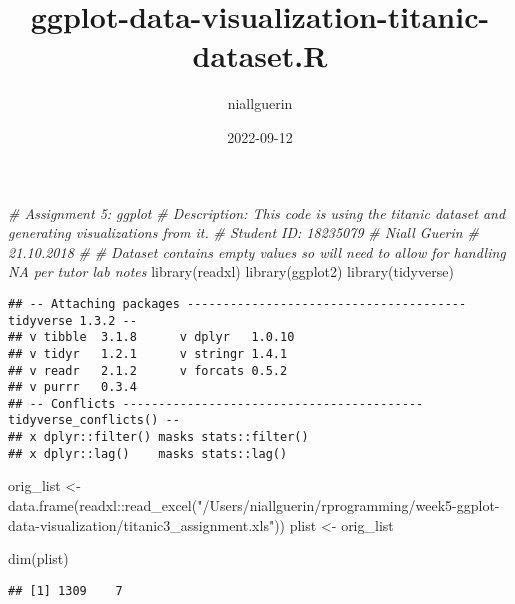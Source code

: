 \documentclass[
]{article}
\title{ggplot-data-visualization-titanic-dataset.R}
\author{niallguerin}
\date{2022-09-12}
\newenvironment{Shaded}{\begin{snugshade}}{\end{snugshade}}
\newcommand{\CommentTok}[1]{\textcolor[rgb]{0.56,0.35,0.01}{\textit{#1}}}
\newcommand{\FunctionTok}[1]{\textcolor[rgb]{0.00,0.00,0.00}{#1}}
\newcommand{\NormalTok}[1]{#1}
\newcommand{\OtherTok}[1]{\textcolor[rgb]{0.56,0.35,0.01}{#1}}
\newcommand{\SpecialCharTok}[1]{\textcolor[rgb]{0.00,0.00,0.00}{#1}}
\newcommand{\StringTok}[1]{\textcolor[rgb]{0.31,0.60,0.02}{#1}}
\begin{document}
\maketitle

\begin{Shaded}
\begin{Highlighting}[]
\CommentTok{\# Assignment 5: ggplot}
\CommentTok{\# Description: This code is using the titanic dataset and generating visualizations from it.}
\CommentTok{\# Student ID: 18235079}
\CommentTok{\# Niall Guerin}
\CommentTok{\# 21.10.2018}
\CommentTok{\#}
\CommentTok{\# Dataset contains empty values so will need to allow for handling NA per tutor lab notes}
\FunctionTok{library}\NormalTok{(readxl)}
\FunctionTok{library}\NormalTok{(ggplot2)}
\FunctionTok{library}\NormalTok{(tidyverse)}
\end{Highlighting}
\end{Shaded}

\begin{verbatim}
## -- Attaching packages --------------------------------------- tidyverse 1.3.2 --
## v tibble  3.1.8      v dplyr   1.0.10
## v tidyr   1.2.1      v stringr 1.4.1 
## v readr   2.1.2      v forcats 0.5.2 
## v purrr   0.3.4      
## -- Conflicts ------------------------------------------ tidyverse_conflicts() --
## x dplyr::filter() masks stats::filter()
## x dplyr::lag()    masks stats::lag()
\end{verbatim}

\begin{Shaded}
\begin{Highlighting}[]
\NormalTok{orig\_list }\OtherTok{\textless{}{-}} \FunctionTok{data.frame}\NormalTok{(readxl}\SpecialCharTok{::}\FunctionTok{read\_excel}\NormalTok{(}\StringTok{"/Users/niallguerin/rprogramming/week5{-}ggplot{-}data{-}visualization/titanic3\_assignment.xls"}\NormalTok{))}
\NormalTok{plist }\OtherTok{\textless{}{-}}\NormalTok{ orig\_list}

\FunctionTok{dim}\NormalTok{(plist)}
\end{Highlighting}
\end{Shaded}

\begin{verbatim}
## [1] 1309    7
\end{verbatim}
\end{document}
